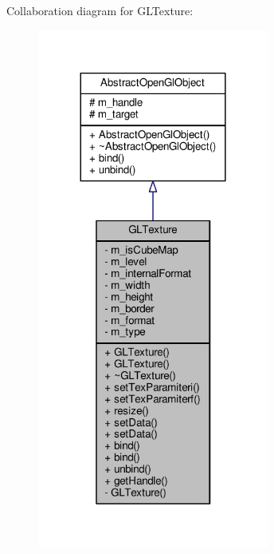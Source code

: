 Collaboration diagram for G\-L\-Texture\-:\nopagebreak
\begin{figure}[H]
\begin{center}
\leavevmode
\includegraphics[width=216pt]{class_g_l_texture__coll__graph}
\end{center}
\end{figure}
